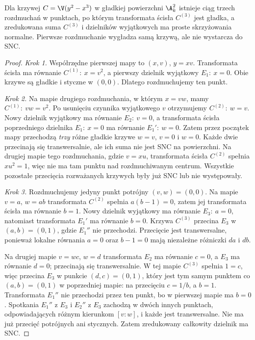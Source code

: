 \begin{twierdzenie}
\label{tw:ga5-embedded-cusp}
Dla krzywej $C=\V(y^2-x^3)$ w gładkiej powierzchni
$\A^2_k$ istnieje ciąg trzech rozdmuchań w punktach,
po którym transformata ścisła $C^{(3)}$ jest gładka,
a zredukowana suma $C^{(3)}$ i dzielników wyjątkowych
ma proste skrzyżowania normalne. Pierwsze rozdmuchanie
wygładza samą krzywą, ale nie wystarcza do SNC.
\end{twierdzenie}
\begin{proof}
\emph{Krok 1.} Współrzędne pierwszej mapy to
$(x,v)$, $y=xv$. Transformata ścisła ma równanie
$C^{(1)}:\ x=v^2$, a pierwszy dzielnik wyjątkowy
$E_1:\ x=0$. Obie krzywe są gładkie i styczne
w $(0,0)$. Dlatego rozdmuchujemy ten punkt.

\emph{Krok 2.} Na mapie drugiego rozdmuchania,
w którym $x=vw$, mamy
$C^{(1)}:\ vw=v^2$. Po usunięciu czynnika
wyjątkowego $v$ otrzymujemy
$C^{(2)}:\ w=v$. Nowy dzielnik wyjątkowy ma
równanie $E_2:\ v=0$, a transformata ścisła
poprzedniego dzielnika $E_1:\ x=0$ ma równanie
$E_1':\ w=0$. Zatem przez początek mapy
przechodzą \emph{trzy} różne gładkie krzywe
$w=v$, $v=0$ i $w=0$. Każde dwie przecinają się
transwersalnie, ale ich suma nie jest SNC na powierzchni.
Na drugiej mapie tego rozdmuchania, gdzie $v=xu$,
transformata ścisła $C^{(2)}$ spełnia $xu^2=1$,
więc nie ma tam punktu nad rozdmuchiwanym centrum.
Wszystkie pozostałe przecięcia rozważanych krzywych
były już SNC lub nie występowały.

\emph{Krok 3.} Rozdmuchujemy jedyny punkt potrójny
$(v,w)=(0,0)$. Na mapie $v=a$, $w=ab$
transformata $C^{(2)}$ spełnia
$a(b-1)=0$, zatem jej transformata ścisła ma
równanie $b=1$. Nowy dzielnik wyjątkowy ma
równanie $E_3:\ a=0$, natomiast transformata $E_1'$
ma równanie $b=0$. Krzywa $C^{(3)}$ przecina
$E_3$ w $(a,b)=(0,1)$, gdzie $E_1''$ nie przechodzi.
Przecięcie jest transwersalne, ponieważ lokalne
równania $a=0$ oraz $b-1=0$ mają niezależne
różniczki $da$ i $db$.

Na drugiej mapie $v=wc$, $w=d$ transformata
$E_2$ ma równanie $c=0$, a $E_3$ ma równanie
$d=0$; przecinają się transwersalnie. W tej mapie
$C^{(3)}$ spełnia $1=c$, więc przecina $E_3$
w punkcie $(d,c)=(0,1)$, który jest tym samym
punktem co $(a,b)=(0,1)$ w poprzedniej mapie:
na przecięciu $c=1/b$, a $b=1$.
Transformata $E_1''$ nie przechodzi przez ten punkt,
bo w pierwszej mapie ma $b=0$. Spotkania
$E_1''$ z $E_3$ i $E_2''$ z $E_3$ zachodzą
w dwóch innych punktach, odpowiadających różnym
kierunkom $[v:w]$, i każde jest transwersalne.
Nie ma już przecięć potrójnych ani stycznych.
Zatem zredukowany całkowity dzielnik ma SNC.
\end{proof}

